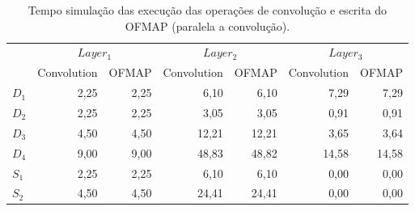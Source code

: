 \begin{table}[ht!]
\centering
\caption{Tempo simulação das execução das operações de convolução e escrita do OFMAP (paralela a convolução).}
\label{tab:5-dnn-layer}
\begin{tabular}{lrrrrrr}
\toprule
 & \multicolumn{2}{c}{$Layer_1$} & \multicolumn{2}{c}{$Layer_2$} & \multicolumn{2}{c}{$Layer_3$} \\
\cmidrule(r){2-3} \cmidrule(lr){4-5} \cmidrule(l){6-7}
 & Convolution & OFMAP & Convolution & OFMAP & Convolution & OFMAP \\
\midrule
$D_1$ & 2,25 & 2,25 & 6,10 & 6,10 & 7,29 & 7,29 \\
$D_2$ & 2,25 & 2,25 & 3,05 & 3,05 & 0,91 & 0,91 \\
$D_3$ & 4,50 & 4,50 & 12,21 & 12,21 & 3,65 & 3,64 \\
$D_4$ & 9,00 & 9,00 & 48,83 & 48,82 & 14,58 & 14,58 \\
$S_1$ & 2,25 & 2,25 & 6,10 & 6,10 & 0,00 & 0,00 \\
$S_2$ & 4,50 & 4,50 & 24,41 & 24,41 & 0,00 & 0,00 \\
\bottomrule
\end{tabular}
\end{table}